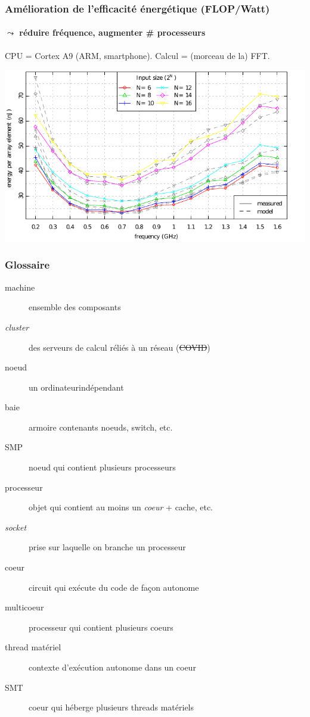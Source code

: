 \documentclass[xcolor={x11names,svgnames}]{beamer}
\begin{document}
\begin{frame}
  \frametitle{Amélioration de l'efficacité énergétique (FLOP/Watt)}
  \framesubtitle{$\leadsto$ réduire fréquence, augmenter \# processeurs}

  \centering

  \small CPU = Cortex A9 (ARM, smartphone). Calcul = (morceau de la) FFT. 
  
  \includegraphics[width=\textwidth]{cpu_freq_scaling.pdf}
\end{frame}


\begin{frame}
  \frametitle{Glossaire}

    \begin{description}
    \item[machine] ensemble des composants

    \item[\textit{cluster}] des serveurs de calcul réliés à un réseau (\sout{COVID})
      
    \item[noeud] un \og ordinateur\fg indépendant

    \item[baie] armoire contenants noeuds, switch, etc.

    \item[SMP] noeud qui contient plusieurs processeurs

    \item[processeur] objet qui contient au moins un \emph{coeur} + cache, etc.
  
    \item[\emph{socket}] prise sur laquelle on branche un processeur

    \item[coeur] circuit qui exécute du code de façon autonome

    \item[multicoeur] processeur qui contient plusieurs coeurs
  
    \item[thread matériel] contexte d'exécution autonome dans un coeur

    \item[SMT] coeur qui héberge plusieurs threads matériels
    \end{description}

\end{frame}
\end{document}
